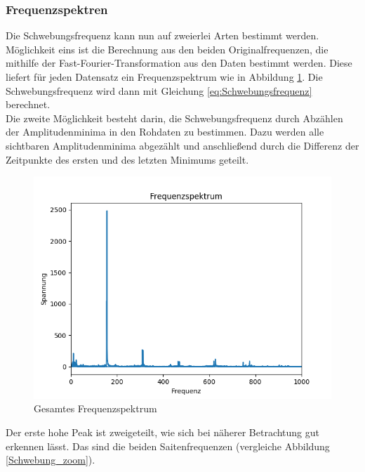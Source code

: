 \documentclass[12pt,a4paper]{article}
\begin{document}
\subsubsection{Frequenzspektren}
Die Schwebungsfrequenz kann nun auf zweierlei Arten bestimmt werden. Möglichkeit eins ist die Berechnung aus den beiden Originalfrequenzen, die mithilfe der Fast-Fourier-Transformation aus den Daten bestimmt werden. Diese liefert für jeden Datensatz ein Frequenzspektrum wie in Abbildung \ref{Schwebung_Frequenzspektrum}. Die Schwebungsfrequenz wird dann mit Gleichung \ref{eq:Schwebungsfrequenz} berechnet. \\
Die zweite Möglichkeit besteht darin, die Schwebungsfrequenz durch Abzählen der Amplitudenminima in den Rohdaten zu bestimmen. Dazu werden alle sichtbaren Amplitudenminima abgezählt und anschließend durch die Differenz der Zeitpunkte des ersten und des letzten Minimums geteilt.
\begin{figure}
\includegraphics[scale=1]{Bilder/Frequenzspektrum_ges.png}
\centering
\caption{Gesamtes Frequenzspektrum}
\label{Schwebung_Frequenzspektrum}
\end{figure}
Der erste hohe Peak ist zweigeteilt, wie sich bei näherer Betrachtung gut erkennen lässt. Das sind die beiden Saitenfrequenzen (vergleiche Abbildung \ref{Schwebung_zoom}).
\end{document}
